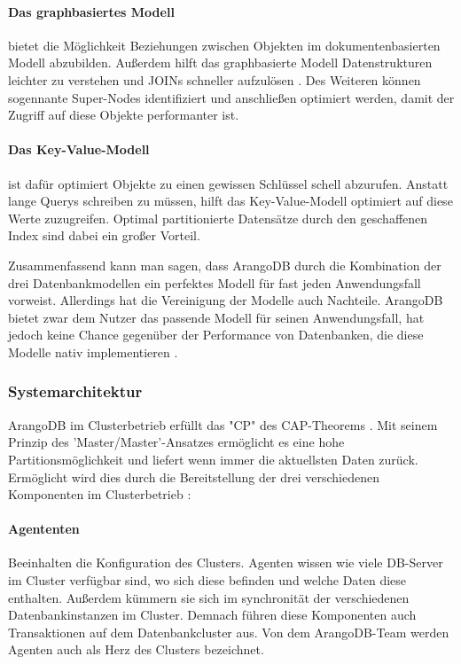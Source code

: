 \paragraph{Das graphbasiertes Modell} bietet die Möglichkeit Beziehungen zwischen Objekten im dokumentenbasierten Modell abzubilden. Außerdem hilft das graphbasierte Modell Datenstrukturen leichter zu verstehen und JOINs schneller aufzulösen \cite{AWS_graph}. Des Weiteren können sogennante Super-Nodes identifiziert und anschließen optimiert werden, damit der Zugriff auf diese Objekte performanter ist.

\paragraph{Das Key-Value-Modell} ist dafür optimiert Objekte zu einen gewissen Schlüssel schell abzurufen.  Anstatt lange Querys schreiben zu müssen, hilft das Key-Value-Modell optimiert auf diese Werte zuzugreifen. Optimal partitionierte Datensätze durch den geschaffenen Index sind dabei ein großer Vorteil. \cite{AWS_keyvalue}

Zusammenfassend kann man sagen, dass ArangoDB durch die Kombination der drei Datenbankmodellen ein perfektes Modell für fast jeden Anwendungsfall vorweist. Allerdings hat die Vereinigung der Modelle auch Nachteile. ArangoDB bietet zwar dem Nutzer das passende Modell für seinen Anwendungsfall, hat jedoch keine Chance gegenüber der Performance von Datenbanken, die diese Modelle nativ implementieren \cite{ADB_benchmark}.

\subsubsection{Systemarchitektur}
ArangoDB im Clusterbetrieb erfüllt das "CP" des CAP-Theorems \cite{CAP}. Mit seinem Prinzip des 'Master/Master'-Ansatzes ermöglicht es eine hohe Partitionsmöglichkeit und liefert wenn immer die aktuellsten Daten zurück. Ermöglicht wird dies durch die Bereitstellung der drei verschiedenen Komponenten im Clusterbetrieb \cite{ADB_clusterarch}:
\paragraph{Agententen} 
Beeinhalten die Konfiguration des Clusters. Agenten wissen wie viele DB-Server im Cluster verfügbar sind, wo sich diese befinden und welche Daten diese enthalten. Außerdem kümmern sie sich im synchronität der verschiedenen Datenbankinstanzen im Cluster. Demnach führen diese Komponenten auch Transaktionen auf dem Datenbankcluster aus. Von dem ArangoDB-Team werden Agenten auch als Herz des Clusters bezeichnet. \cite{ADB_clusterarch}
